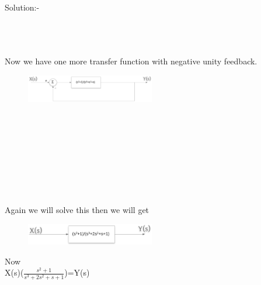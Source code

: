 \documentclass[journal,12pt,twocolumn]{IEEEtran}
\begin{document}
\begin{frame}{Solution:- }
\begin{figure}[h]
\end{figure}
\\\\\\
Now we have one more transfer function with negative unity feedback.
\begin{figure}[h]
\includegraphics[width=0.5\textwidth]{./figs/pic6.eps}
\end{figure}
\\\\\\\\\\\\\\\\
Again we will solve this then we will get
\begin{figure}[h]
\includegraphics[width=0.5\textwidth]{./figs/pic8.eps}
\end{figure}

Now\\

X(s)($\frac{s^2+1}{s^3+2s^2+s+1}$)=Y(s)\\


\end{frame}
\end{document}
